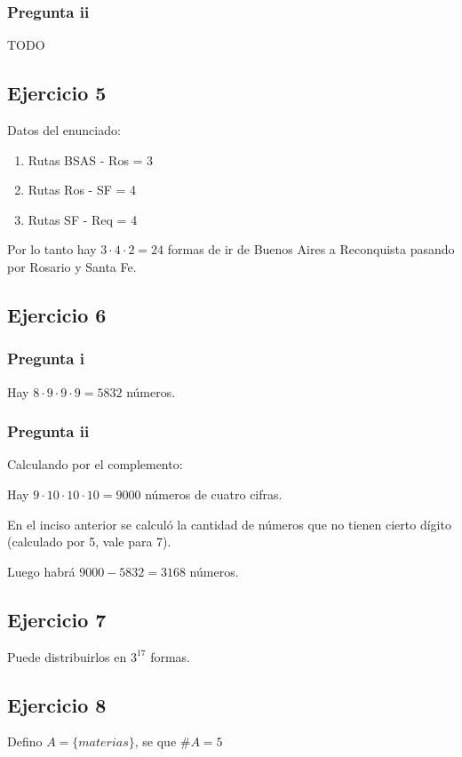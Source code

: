 \subsubsection{Pregunta ii}
TODO

\subsection{Ejercicio 5}

Datos del enunciado:
\begin{enumerate}
    \item Rutas BSAS - Ros = 3
    \item Rutas Ros - SF = 4
    \item Rutas SF - Req = 4
\end{enumerate}

Por lo tanto hay $ 3 \cdot 4 \cdot 2 = 24 $ formas de ir de Buenos Aires a Reconquista pasando por Rosario y Santa Fe.

\subsection{Ejercicio 6}
\subsubsection{Pregunta i}
Hay $ 8 \cdot 9\cdot 9\cdot 9 = 5832 $ números.

\subsubsection{Pregunta ii}
Calculando por el complemento:

Hay $ 9 \cdot 10\cdot 10\cdot 10 = 9000 $ números de cuatro cifras.

En el inciso anterior se calculó la cantidad de números que no tienen cierto dígito (calculado por 5, vale para 7).

Luego habrá $ 9000 - 5832 = 3168 $ números.

\subsection{Ejercicio 7}
Puede distribuirlos en $ 3^{17} $ formas.

\subsection{Ejercicio 8}

Defino $ A = \{ materias \}$, se que $ \#A = 5 $

